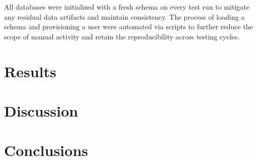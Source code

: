 All databases were initialized with a fresh schema on every test run to mitigate any residual data artifacts and maintain consistency. The process of loading a schema and provisioning a user were automated via scripts to further reduce the scope of manual activity and retain the reproducibility across testing cycles.

\section{Results}
\label{sec:results}

\section{Discussion}
\label{sec:discussion}

\section{Conclusions}
\label{sec:conclusions}
